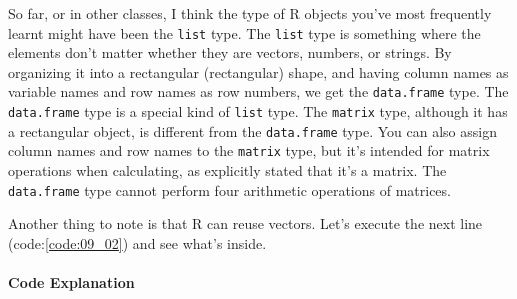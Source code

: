 \documentclass{ltjsbook}
\begin{document}
So far, or in other classes, I think the type of R objects you've most frequently learnt might have been the \texttt{list} type. The \texttt{list} type is something where the elements don't matter whether they are vectors, numbers, or strings. By organizing it into a rectangular (rectangular) shape, and having column names as variable names and row names as row numbers, we get the \texttt{data.frame} type. The \texttt{data.frame} type is a special kind of \texttt{list} type. The \texttt{matrix} type, although it has a rectangular object, is different from the \texttt{data.frame} type. You can also assign column names and row names to the \texttt{matrix} type, but it's intended for matrix operations when calculating, as explicitly stated that it's a matrix. The \texttt{data.frame} type cannot perform four arithmetic operations of matrices.

Another thing to note is that R can reuse vectors. Let's execute the next line (code:\ref{code:09_02}) and see what's inside.


\paragraph{Code Explanation}



\end{document}

